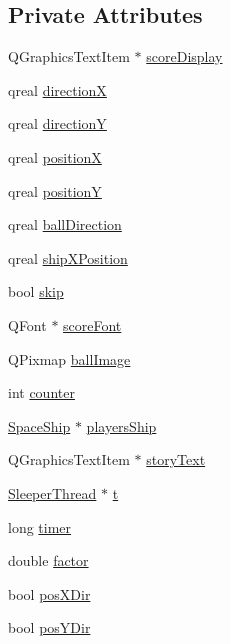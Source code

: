 \subsection*{Private Attributes}
\begin{DoxyCompactItemize}
\item 
QGraphicsTextItem $\ast$ \hyperlink{class_ball_a7b47b0a7d1ff7ea193a1035b399abeaf}{scoreDisplay}
\item 
qreal \hyperlink{class_ball_a2442b2ceb1bdab9cb1d829cc35fb6aa4}{directionX}
\item 
qreal \hyperlink{class_ball_aed25c719861fb4a6cc245d4792576fb9}{directionY}
\item 
qreal \hyperlink{class_ball_a0337f9f0526bac5d34b8ead4d4b1abca}{positionX}
\item 
qreal \hyperlink{class_ball_abfd862991526b1acef79f3651e3056e1}{positionY}
\item 
qreal \hyperlink{class_ball_a94c4804af675557bf6f59c9db0426eb4}{ballDirection}
\item 
qreal \hyperlink{class_ball_a3d1c8506eef7e0fbac97df090d320cfd}{shipXPosition}
\item 
bool \hyperlink{class_ball_a41ecbffc5befc38ab013c41fe86cda41}{skip}
\item 
QFont $\ast$ \hyperlink{class_ball_a7e1772c390324066ab62d42f18dbd04d}{scoreFont}
\item 
QPixmap \hyperlink{class_ball_a45214a2a52bbb8d2635e2233d7be8d91}{ballImage}
\item 
int \hyperlink{class_ball_a4228ca7d0e514c7a5396756301a451e6}{counter}
\item 
\hyperlink{class_space_ship}{SpaceShip} $\ast$ \hyperlink{class_ball_a056866440103518774a90e7c037e660d}{playersShip}
\item 
QGraphicsTextItem $\ast$ \hyperlink{class_ball_a0c03dcd274f553cc049ed0ede546b33f}{storyText}
\item 
\hyperlink{class_sleeper_thread}{SleeperThread} $\ast$ \hyperlink{class_ball_a5129c6e48575e4599ad1d5aba6e26e2b}{t}
\item 
long \hyperlink{class_ball_a51083e10e55e81e79491670c42525bfa}{timer}
\item 
double \hyperlink{class_ball_a230382eb75790548b8c504c511449a77}{factor}
\item 
bool \hyperlink{class_ball_a8b651526e7ac08c042a1aac5e287556d}{posXDir}
\item 
bool \hyperlink{class_ball_a2711040c89603b039982eb1c48c7d56c}{posYDir}
\end{DoxyCompactItemize}
